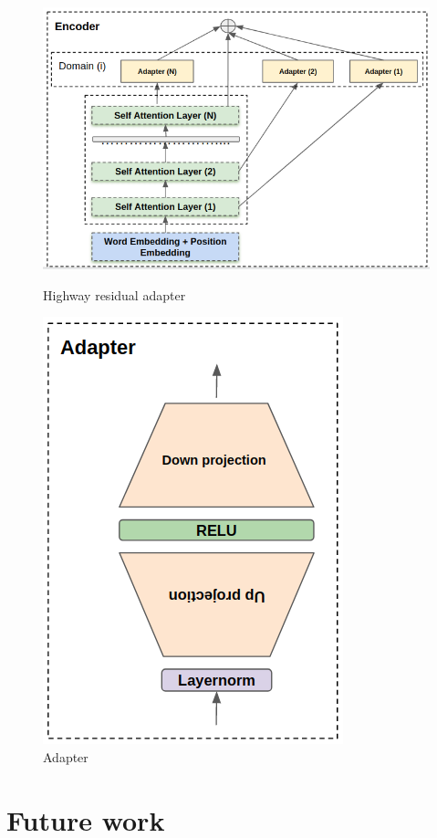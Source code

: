 \documentclass[12pt,a4paper,twoside]{report}
\theoremstyle{definition}
\begin{document}
\begin{figure}[h!]
\parbox{.45\linewidth}{
\begin{center}
\includegraphics[scale=0.45]{highway_residual}
\caption{Highway residual adapter}
\label{fig:highwayres}
\end{center}
}
\hfill
\parbox{.45\linewidth}{
\begin{center}
\includegraphics[scale=0.45]{adapter}
\caption{Adapter}
\label{fig:adapter}
\end{center}}
\end{figure}

\section*{Future work}
\end{document}

